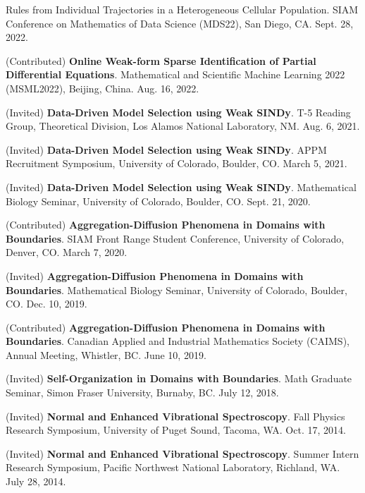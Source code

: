 \documentclass[letterpaper,11pt,oneside]{article}
\begin{document}
\begin{enumerate}[label={[\arabic*]}]
{Rules from Individual Trajectories in a Heterogeneous Cellular Population}. SIAM Conference on Mathematics of Data Science (MDS22), San Diego, CA. Sept. 28, 2022.
\item (Contributed) \textbf{Online Weak-form Sparse Identification of Partial Differential Equations}. Mathematical and Scientific Machine Learning 2022 (MSML2022), Beijing, China. Aug. 16, 2022.
\item (Invited) \textbf{Data-Driven Model Selection using Weak SINDy}. T-5 Reading Group, Theoretical Division, Los Alamos National Laboratory, NM. Aug. 6, 2021.
\item (Invited) \textbf{Data-Driven Model Selection using Weak SINDy}. APPM Recruitment Symposium, University of Colorado, Boulder, CO. March 5, 2021.
\item (Invited) \textbf{Data-Driven Model Selection using Weak SINDy}. Mathematical Biology Seminar, University of Colorado, Boulder, CO. Sept. 21, 2020.
\item (Contributed) \textbf{Aggregation-Diffusion Phenomena in Domains with Boundaries}. SIAM Front Range Student Conference, University of Colorado, Denver, CO. March 7, 2020.
\item (Invited) \textbf{Aggregation-Diffusion Phenomena in Domains with Boundaries}. Mathematical Biology Seminar, University of Colorado, Boulder, CO. Dec. 10, 2019.
\item (Contributed) \textbf{Aggregation-Diffusion Phenomena in Domains with Boundaries}. Canadian Applied and Industrial Mathematics Society (CAIMS), Annual Meeting, Whistler, BC. June 10, 2019.
\item (Invited) \textbf{Self-Organization in Domains with Boundaries}. Math Graduate Seminar, Simon Fraser University, Burnaby, BC. July 12, 2018.
\item (Invited) \textbf{Normal and Enhanced Vibrational Spectroscopy}. Fall Physics Research Symposium, University of Puget Sound, Tacoma, WA. Oct. 17, 2014.
\item (Invited) \textbf{Normal and Enhanced Vibrational Spectroscopy}. Summer Intern Research Symposium, Pacific Northwest National Laboratory, Richland, WA. July 28, 2014.
\end{enumerate}
\end{document}
